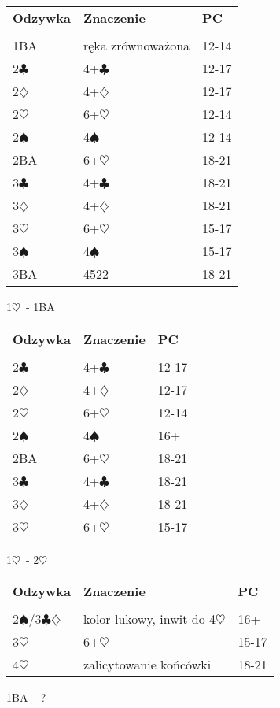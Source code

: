 \documentclass{article}
\renewcommand{\c}{\(\clubsuit\)}
\renewcommand{\d}{\(\diamondsuit\)}
\newcommand{\h}{\(\heartsuit\)}
\newcommand{\s}{\(\spadesuit\)}
\begin{document}
\begin{tabular}{p{2cm} p{10cm} l}
	\textbf{Odzywka} & \textbf{Znaczenie} & \textbf{PC}\\\\
	1BA & ręka zrównoważona & 12-14 \\
	2\c & 4+\c & 12-17 \\
	2\d & 4+\d & 12-17 \\
	2\h & 6+\h & 12-14 \\
	2\s & 4\s & 12-14 \\
	2BA & 6+\h & 18-21 \\
	3\c & 4+\c & 18-21 \\
	3\d & 4+\d & 18-21 \\
	3\h & 6+\h & 15-17 \\
	3\s & 4\s & 15-17 \\
	3BA & 4522 & 18-21 \\
\end{tabular}
\begin{center}\LARGE{1\h\ - 1BA}
\end{center}

\begin{tabular}{p{2cm} p{10cm} l}
	\textbf{Odzywka} & \textbf{Znaczenie} & \textbf{PC}\\\\
	2\c & 4+\c & 12-17 \\
	2\d & 4+\d & 12-17 \\
	2\h & 6+\h & 12-14 \\
	2\s & 4\s & 16+ \\
	2BA & 6+\h & 18-21 \\
	3\c & 4+\c & 18-21 \\
	3\d & 4+\d & 18-21 \\
	3\h & 6+\h & 15-17 \\
\end{tabular}
\begin{center}\LARGE{1\h\ - 2\h}
\end{center}

\begin{tabular}{p{2cm} p{10cm} l}
	\textbf{Odzywka} & \textbf{Znaczenie} & \textbf{PC}\\\\
	2\s/3\c\d & kolor lukowy\footnotemark, inwit do 4\h & 16+ \\
	3\h & 6+\h & 15-17 \\
	4\h & zalicytowanie końcówki & 18-21 \\
\end{tabular}
\newpage
\begin{center}\LARGE{1BA\ - ?}
\end{center}
\end{document}
